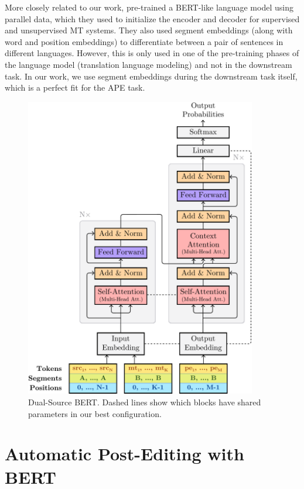 More closely related to our work, \citet{lample2019xlm}
pre-trained a BERT-like language model using parallel data, which
they used to initialize the encoder and decoder for supervised and
unsupervised MT systems. They also used segment embeddings (along
with word and position embeddings) to differentiate between a pair of
sentences in different languages. However, this is only used in one
of the pre-training phases of the language model (translation
language modeling) and not in the downstream task. In our work, we
use segment embeddings during the downstream task itself, which is a
perfect fit for the APE task.

\begin{figure}[ht!]
    \centering
    \includegraphics[width=0.9\textwidth]{Figures/bert-ape-diagram.pdf}
    \caption[Dual-Source BERT.]{Dual-Source BERT. Dashed lines show which blocks have shared parameters in our best configuration.}
    \label{fig:transformer_diagram}
\end{figure}

\section{Automatic Post-Editing with BERT}\label{sec:ape_bert}

